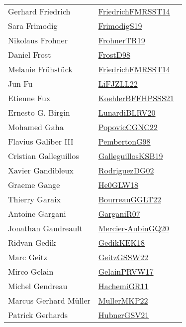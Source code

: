 {\begin{longtable}{p{4cm}p{20cm}}
Gerhard Friedrich & \href{}{FriedrichFMRSST14}~\cite{FriedrichFMRSST14}\\
Sara Frimodig & \href{works/FrimodigS19.pdf}{FrimodigS19}~\cite{FrimodigS19}\\
Nikolaus Frohner & \href{works/FrohnerTR19.pdf}{FrohnerTR19}~\cite{FrohnerTR19}\\
Daniel Frost & \href{works/FrostD98.pdf}{FrostD98}~\cite{FrostD98}\\
Melanie Fr{\"{u}}hst{\"{u}}ck & \href{}{FriedrichFMRSST14}~\cite{FriedrichFMRSST14}\\
Jun Fu & \href{works/LiFJZLL22.pdf}{LiFJZLL22}~\cite{LiFJZLL22}\\
Etienne Fux & \href{works/KoehlerBFFHPSSS21.pdf}{KoehlerBFFHPSSS21}~\cite{KoehlerBFFHPSSS21}\\
Ernesto G. Birgin & \href{works/LunardiBLRV20.pdf}{LunardiBLRV20}~\cite{LunardiBLRV20}\\
Mohamed Gaha & \href{works/PopovicCGNC22.pdf}{PopovicCGNC22}~\cite{PopovicCGNC22}\\
Flavius Galiber III & \href{works/PembertonG98.pdf}{PembertonG98}~\cite{PembertonG98}\\
Cristian Galleguillos & \href{works/GalleguillosKSB19.pdf}{GalleguillosKSB19}~\cite{GalleguillosKSB19}\\
Xavier Gandibleux & \href{works/RodriguezDG02.pdf}{RodriguezDG02}~\cite{RodriguezDG02}\\
Graeme Gange & \href{works/He0GLW18.pdf}{He0GLW18}~\cite{He0GLW18}\\
Thierry Garaix & \href{works/BourreauGGLT22.pdf}{BourreauGGLT22}~\cite{BourreauGGLT22}\\
Antoine Gargani & \href{works/GarganiR07.pdf}{GarganiR07}~\cite{GarganiR07}\\
Jonathan Gaudreault & \href{works/Mercier-AubinGQ20.pdf}{Mercier-AubinGQ20}~\cite{Mercier-AubinGQ20}\\
Ridvan Gedik & \href{works/GedikKEK18.pdf}{GedikKEK18}~\cite{GedikKEK18}\\
Marc Geitz & \href{works/GeitzGSSW22.pdf}{GeitzGSSW22}~\cite{GeitzGSSW22}\\
Mirco Gelain & \href{works/GelainPRVW17.pdf}{GelainPRVW17}~\cite{GelainPRVW17}\\
Michel Gendreau & \href{works/HachemiGR11.pdf}{HachemiGR11}~\cite{HachemiGR11}\\
Marcus Gerhard M{\"{u}}ller & \href{works/MullerMKP22.pdf}{MullerMKP22}~\cite{MullerMKP22}\\
Patrick Gerhards & \href{works/HubnerGSV21.pdf}{HubnerGSV21}~\cite{HubnerGSV21}\\

\end{longtable}}
